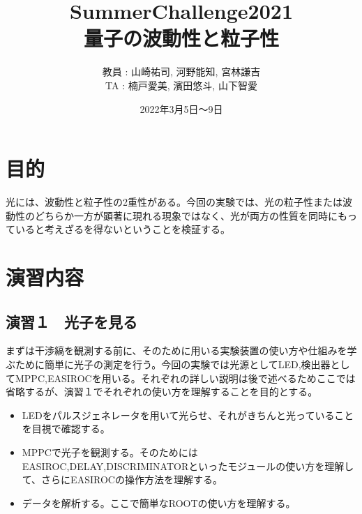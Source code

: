 \documentclass[uplatex,10pt,a4j]{jsarticle}
\begin{document}
\begin{titlepage}
  \title{SummerChallenge2021 \\ \Huge 量子の波動性と粒子性}

  \author{教員 : 山崎祐司, 河野能知, 宮林謙吉 \\TA : 楠戸愛美, 濱田悠斗, 山下智愛}
  \date{2022年3月5日〜9日}
  \maketitle
\end{titlepage}

\tableofcontents
\clearpage

\section{目的}
光には、波動性と粒子性の2重性がある。今回の実験では、光の粒子性または波動性のどちらか一方が顕著に現れる現象ではなく、光が両方の性質を同時にもっていると考えざるを得ないということを検証する。

\section{演習内容}

\subsection{演習１　光子を見る}
まずは干渉縞を観測する前に、そのために用いる実験装置の使い方や仕組みを学ぶために簡単に光子の測定を行う。今回の実験では光源としてLED,検出器としてMPPC,EASIROCを用いる。それぞれの詳しい説明は後で述べるためここでは省略するが、演習１でそれぞれの使い方を理解することを目的とする。
\begin{itemize}
  \item LEDをパルスジェネレータを用いて光らせ、それがきちんと光っていることを目視で確認する。
  \item MPPCで光子を観測する。そのためにはEASIROC,DELAY,DISCRIMINATORといったモジュールの使い方を理解して、さらにEASIROCの操作方法を理解する。
  \item データを解析する。ここで簡単なROOTの使い方を理解する。
\end{itemize}
\end{document}
